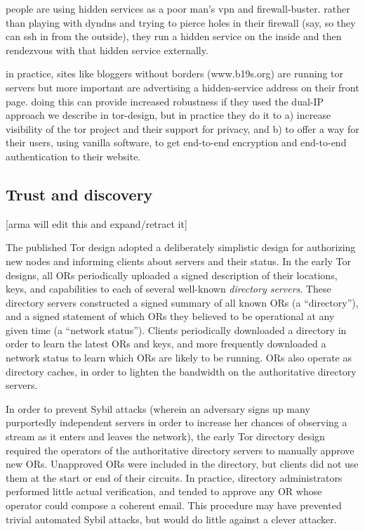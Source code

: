\documentclass{llncs}
\begin{document}
people are using hidden services as a poor man's vpn and firewall-buster.
rather than playing with dyndns and trying to pierce holes in their
firewall (say, so they can ssh in from the outside), they run a hidden
service on the inside and then rendezvous with that hidden service
externally.

in practice, sites like bloggers without borders (www.b19s.org) are
running tor servers but more important are advertising a hidden-service
address on their front page. doing this can provide increased robustness
if they used the dual-IP approach we describe in tor-design, but in
practice they do it to a) increase visibility of the tor project and their
support for privacy, and b) to offer a way for their users, using vanilla
software, to get end-to-end encryption and end-to-end authentication to
their website.


\subsection{Trust and discovery}

[arma will edit this and expand/retract it]

The published Tor design adopted a deliberately simplistic design for
authorizing new nodes and informing clients about servers and their status.
In the early Tor designs, all ORs periodically uploaded a signed description
of their locations, keys, and capabilities to each of several well-known {\it
  directory servers}.  These directory servers constructed a signed summary
of all known ORs (a ``directory''), and a signed statement of which ORs they
believed to be operational at any given time (a ``network status'').  Clients
periodically downloaded a directory in order to learn the latest ORs and
keys, and more frequently downloaded a network status to learn which ORs are
likely to be running.  ORs also operate as directory caches, in order to
lighten the bandwidth on the authoritative directory servers.

In order to prevent Sybil attacks (wherein an adversary signs up many
purportedly independent servers in order to increase her chances of observing
a stream as it enters and leaves the network), the early Tor directory design
required the operators of the authoritative directory servers to manually
approve new ORs.  Unapproved ORs were included in the directory, but clients
did not use them at the start or end of their circuits.  In practice,
directory administrators performed little actual verification, and tended to
approve any OR whose operator could compose a coherent email.  This procedure
may have prevented trivial automated Sybil attacks, but would do little
against a clever attacker.
\end{document}
